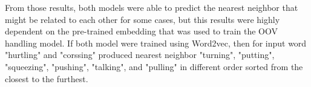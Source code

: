         From those results, both models were able to predict the
        nearest neighbor that might be related to each other for some
        cases, but this results were highly dependent on the pre-trained
        embedding that was used to train the OOV handling model. If both model
        were trained using Word2vec, then for input word "hurtling"
        and "corssing" produced nearest neighbor "turning", "putting",
        "squeezing", "pushing", "talking", and "pulling" in different
        order sorted from the closest to the furthest.
        


